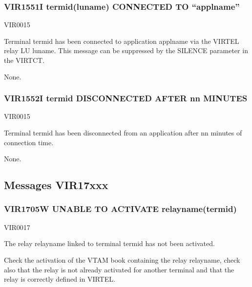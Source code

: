 \documentclass[letterpaper,10pt,english]{sphinxmanual}
\begin{document}
\subsubsection{VIR1551I termid(luname) CONNECTED TO “applname”}
\label{\detokenize{messages:vir1551i-termid-luname-connected-to-applname}}\begin{description}
\sphinxAtStartPar
VIR0015

\sphinxAtStartPar
Terminal termid has been connected to application applname via the VIRTEL relay LU luname. This message can be suppressed by the SILENCE parameter in the VIRTCT.

\sphinxAtStartPar
None.

\end{description}


\subsubsection{VIR1552I termid DISCONNECTED AFTER nn MINUTES}
\label{\detokenize{messages:vir1552i-termid-disconnected-after-nn-minutes}}\begin{description}
\sphinxAtStartPar
VIR0015

\sphinxAtStartPar
Terminal termid has been disconnected from an application after nn minutes of connection time.

\sphinxAtStartPar
None.

\end{description}


\subsection{Messages VIR17xxx}
\label{\detokenize{messages:messages-vir17xxx}}

\subsubsection{VIR1705W UNABLE TO ACTIVATE relayname(termid)}
\label{\detokenize{messages:vir1705w-unable-to-activate-relayname-termid}}\begin{description}
\sphinxAtStartPar
VIR0017

\sphinxAtStartPar
The relay relayname linked to terminal termid has not been activated.

\sphinxAtStartPar
Check the activation of the VTAM book containing the relay relayname, check also that the relay is not already activated for another terminal and that the relay is correctly defined in VIRTEL.

\end{description}
\end{document}
